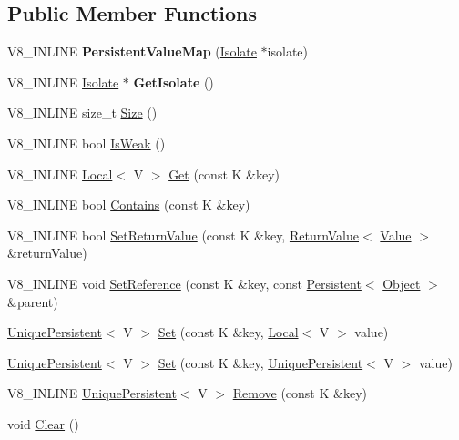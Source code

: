\subsection*{Public Member Functions}
\begin{DoxyCompactItemize}
\item 
\hypertarget{classv8_1_1_persistent_value_map_aad3302090409c712cbbe9116a838da33}{}V8\+\_\+\+I\+N\+L\+I\+N\+E {\bfseries Persistent\+Value\+Map} (\hyperlink{classv8_1_1_isolate}{Isolate} $\ast$isolate)\label{classv8_1_1_persistent_value_map_aad3302090409c712cbbe9116a838da33}

\item 
\hypertarget{classv8_1_1_persistent_value_map_a40317f2321e3ae514314a647800d280f}{}V8\+\_\+\+I\+N\+L\+I\+N\+E \hyperlink{classv8_1_1_isolate}{Isolate} $\ast$ {\bfseries Get\+Isolate} ()\label{classv8_1_1_persistent_value_map_a40317f2321e3ae514314a647800d280f}

\item 
V8\+\_\+\+I\+N\+L\+I\+N\+E size\+\_\+t \hyperlink{classv8_1_1_persistent_value_map_a15913ac66b8cf7d0482fce238cdd2bdd}{Size} ()
\item 
V8\+\_\+\+I\+N\+L\+I\+N\+E bool \hyperlink{classv8_1_1_persistent_value_map_acdf8e68b16ebbd47e00ca2027cfee629}{Is\+Weak} ()
\item 
V8\+\_\+\+I\+N\+L\+I\+N\+E \hyperlink{classv8_1_1_local}{Local}$<$ V $>$ \hyperlink{classv8_1_1_persistent_value_map_a19a924d55eddc33645cc844d4ad71004}{Get} (const K \&key)
\item 
V8\+\_\+\+I\+N\+L\+I\+N\+E bool \hyperlink{classv8_1_1_persistent_value_map_a5e48a6880eca508960aaee1923c4eccb}{Contains} (const K \&key)
\item 
V8\+\_\+\+I\+N\+L\+I\+N\+E bool \hyperlink{classv8_1_1_persistent_value_map_a636688a5afae884d00bf645a77ef7caf}{Set\+Return\+Value} (const K \&key, \hyperlink{classv8_1_1_return_value}{Return\+Value}$<$ \hyperlink{classv8_1_1_value}{Value} $>$ \&return\+Value)
\item 
V8\+\_\+\+I\+N\+L\+I\+N\+E void \hyperlink{classv8_1_1_persistent_value_map_ac661e24ff7c196d3401e6fd780b05efc}{Set\+Reference} (const K \&key, const \hyperlink{classv8_1_1_persistent}{Persistent}$<$ \hyperlink{classv8_1_1_object}{Object} $>$ \&parent)
\item 
\hyperlink{classv8_1_1_unique_persistent}{Unique\+Persistent}$<$ V $>$ \hyperlink{classv8_1_1_persistent_value_map_af1b5e39f5d0275d8d58d787de5a181d9}{Set} (const K \&key, \hyperlink{classv8_1_1_local}{Local}$<$ V $>$ value)
\item 
\hyperlink{classv8_1_1_unique_persistent}{Unique\+Persistent}$<$ V $>$ \hyperlink{classv8_1_1_persistent_value_map_a31f69108cbb1b481ca5112c22c274681}{Set} (const K \&key, \hyperlink{classv8_1_1_unique_persistent}{Unique\+Persistent}$<$ V $>$ value)
\item 
V8\+\_\+\+I\+N\+L\+I\+N\+E \hyperlink{classv8_1_1_unique_persistent}{Unique\+Persistent}$<$ V $>$ \hyperlink{classv8_1_1_persistent_value_map_a3a00a57b9a465abf32d92d923bf9d1fd}{Remove} (const K \&key)
\item 
void \hyperlink{classv8_1_1_persistent_value_map_acb73f2a873f69adfd15a262ecd90b037}{Clear} ()
\end{DoxyCompactItemize}


